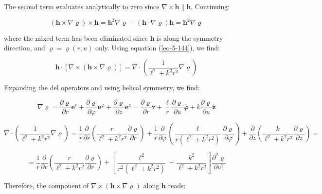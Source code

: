 The second term evaluates analytically to zero since $\nabla\times\mathbf{h}\parallel\mathbf{h}$. Continuing:

\begin{equation}
    (\mathbf{h}\times\nabla\varrho)\times\mathbf{h}=\mathbf{h}^2\nabla\varrho-(\mathbf{h}\cdot\nabla\varrho)\mathbf{h}=\mathbf{h}^2\nabla\varrho
\end{equation}

where the mixed term has been eliminated since $\mathbf{h}$ is along the symmetry direction, and $\varrho=\varrho(r,u)$ only. Using equation (\ref{eq-5-144}), we find:

\begin{equation}
    \mathbf{h}\cdot\left[\nabla\times\left(\mathbf{h}\times\nabla\varrho\right)\right]=\nabla\cdot\left(\frac{1}{\ell^2+k^2r^2}\nabla\varrho\right)
\end{equation}

Expanding the del operators and using helical symmetry, we find:

\begin{equation}
    \nabla\varrho=\frac{\partial\varrho}{\partial r}\mathbf{e}^r+\frac{\partial\varrho}{\partial\varphi}\mathbf{e}^\varphi+\frac{\partial\varrho}{\partial z}\mathbf{e}^z=\frac{\partial\varrho}{\partial r}\mathbf{\hat{r}}+\frac{\ell}{r}\frac{\partial\varrho}{\partial u}\boldsymbol{\hat{\varphi}}+k\frac{\partial\varrho}{\partial u}\mathbf{\hat{z}}
\end{equation}

\begin{equation*}
    \nabla\cdot\left(\frac{1}{\ell^2+k^2r^2}\nabla\varrho\right)=\frac{1}{r}\frac{\partial}{\partial r}\left(\frac{r}{\ell^2+k^2r^2}\frac{\partial\varrho}{\partial r}\right)+\frac{1}{r}\frac{\partial}{\partial\varphi}\left(\frac{\ell}{r(\ell^2+k^2r^2)}\frac{\partial\varrho}{\partial\varphi}\right)+\frac{\partial}{\partial z}\left(\frac{k}{\ell^2+k^2r^2}\frac{\partial\varrho}{\partial z}\right)=
\end{equation*}

\begin{equation}
    =\frac{1}{r}\frac{\partial}{\partial r}\left(\frac{r}{\ell^2+k^2r^2}\frac{\partial\varrho}{\partial r}\right)+\left[\frac{\ell^2}{r^2(\ell^2+k^2r^2)}+\frac{k^2}{\ell^2+k^2r^2}\right]\frac{\partial^2\varrho}{\partial u^2}
\end{equation}

Therefore, the component of $\nabla\times(\mathbf{h}\times\nabla\varrho)$ along $\mathbf{h}$ reads:

